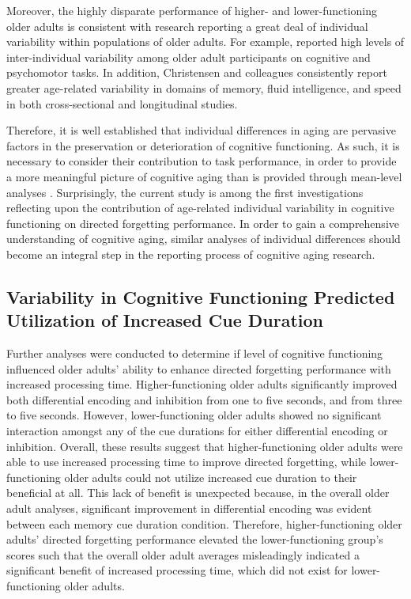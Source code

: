 \documentclass[man]{apa6}\usepackage[]{graphicx}\usepackage[]{color}
\begin{document}
Moreover, the highly disparate performance of higher- and lower-functioning older adults is consistent with research reporting a great deal of individual variability within populations of older adults. For example, \textcite{shammi.bosman.stuss1998} reported high levels of inter-individual variability among older adult participants on cognitive and psychomotor tasks. In addition, Christensen and colleagues \parencite{christensen.et.al1994,christensen.et.al1999,christensen2001} consistently report greater age-related variability in domains of memory, fluid intelligence, and speed in both cross-sectional and longitudinal studies.

Therefore, it is well established that individual differences in aging are pervasive factors in the preservation or deterioration of cognitive functioning. As such, it is necessary to consider their contribution to task performance, in order to provide a more meaningful picture of cognitive aging than is provided through mean-level analyses \parencite{nelson.dannefer1992}. Surprisingly, the current study is among the first investigations reflecting upon the contribution of age-related individual variability in cognitive functioning on directed forgetting performance. In order to gain a comprehensive understanding of cognitive aging, similar analyses of individual differences should become an integral step in the reporting process of cognitive aging research.

\subsection*{Variability in Cognitive Functioning Predicted Utilization of Increased Cue Duration}

Further analyses were conducted to determine if level of cognitive functioning influenced older adults’ ability to enhance directed forgetting performance with increased processing time. Higher-functioning older adults significantly improved both differential encoding and inhibition from one to five seconds, and from three to five seconds. However, lower-functioning older adults showed no significant interaction amongst any of the cue durations for either differential encoding or inhibition. Overall, these results suggest that higher-functioning older adults were able to use increased processing time to improve directed forgetting, while lower-functioning older adults could not utilize increased cue duration to their beneficial at all. This lack of benefit is unexpected because, in the overall older adult analyses, significant improvement in differential encoding was evident between each memory cue duration condition. Therefore, higher-functioning older adults’ directed forgetting performance elevated the lower-functioning group’s scores such that the overall older adult averages misleadingly indicated a significant benefit of increased processing time, which did not exist for lower-functioning older adults.
\end{document}
